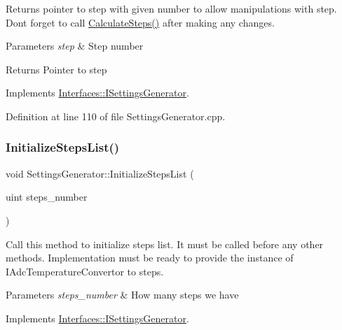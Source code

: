 Returns pointer to step with given number to allow manipulations with step. Don\textquotesingle{}t forget to call \hyperlink{class_settings_generator_a7c9c1a7a3928ba3ce0ad110593b97a96}{Calculate\+Steps()} after making any changes. 


\begin{DoxyParams}{Parameters}
{\em step} & Step number \\
\hline
\end{DoxyParams}
\begin{DoxyReturn}{Returns}
Pointer to step 
\end{DoxyReturn}


Implements \hyperlink{class_interfaces_1_1_i_settings_generator_af1b65a18c3ade3235715ae2e9cdbcfe0}{Interfaces\+::\+I\+Settings\+Generator}.



Definition at line 110 of file Settings\+Generator.\+cpp.

\mbox{\label{class_settings_generator_a84b81d11cb5f83d4066e73a03acfc143}} 
\subsubsection{\texorpdfstring{Initialize\+Steps\+List()}{InitializeStepsList()}}
{\footnotesize\ttfamily void Settings\+Generator\+::\+Initialize\+Steps\+List (\begin{DoxyParamCaption}\item[{uint}]{steps\+\_\+number }\end{DoxyParamCaption})\hspace{0.3cm}{\ttfamily [virtual]}}



Call this method to initialize steps list. It must be called before any other methods. Implementation must be ready to provide the instance of I\+Adc\+Temperature\+Convertor to steps. 


\begin{DoxyParams}{Parameters}
{\em steps\+\_\+number} & How many steps we have \\
\hline
\end{DoxyParams}


Implements \hyperlink{class_interfaces_1_1_i_settings_generator_a4aa0307e906c003012aad75101072c65}{Interfaces\+::\+I\+Settings\+Generator}.



